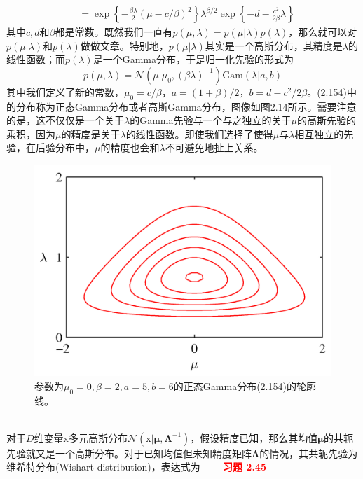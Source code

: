 \documentclass[b5paper]{book}
\numberwithin{equation}{chapter}
\newcommand {\bx} {\boldsymbol{\mathrm{x}}}
\newcommand {\bfMu} {\boldsymbol{\mu}}
\newcommand {\bfLambda} {\boldsymbol{\Lambda}}
\begin{document}
{\begin{equation}
\begin{split}
		&=\exp\left\{-\frac{\beta\lambda}{2}(\mu-c/\beta)^2\right\}\lambda^{\beta/2}\exp\left\{-{d-\frac{c^2}{2\beta}}\lambda\right\}
	\end{split}
	\end{equation}
	其中$c,d$和$\beta$都是常数。既然我们一直有$p(\mu,\lambda)=p(\mu|\lambda)p(\lambda)$，那么就可以对$p(\mu|\lambda)$和$p(\lambda)$做做文章。特别地，$p(\mu|\lambda)$其实是一个高斯分布，其精度是$\lambda$的线性函数；而$p(\lambda)$是一个Gamma分布，于是归一化先验的形式为
	\begin{equation}
		p(\mu,\lambda)=\mathcal{N}(\mu|\mu_0,(\beta\lambda)^{-1})\mathrm{Gam}(\lambda|a,b)
	\end{equation}
	其中我们定义了新的常数，$\mu_0=c/ \beta$，$a=(1+\beta)/2$，$b=d-c^2/2\beta$。(2.154)中的分布称为正态Gamma分布或者高斯Gamma分布，图像如图2.14所示。需要注意的是，这不仅仅是一个关于$\lambda$的Gamma先验与一个与之独立的关于$\mu$的高斯先验的乘积，因为$\mu$的精度是关于$\lambda$的线性函数。即使我们选择了使得$\mu$与$\lambda$相互独立的先验，在后验分布中，$\mu$的精度也会和$\lambda$不可避免地扯上关系。
	\begin{figure}[ht]
		\centering
		\includegraphics[scale=0.8]{Images/2-14.png}
		\caption{参数为$\mu_0=0,\beta=2,a=5,b=6$的正态Gamma分布(2.154)的轮廓线。}
		\label{fig:2-14}
	\end{figure}
	\\
	\indent 对于$D$维变量$\bx$多元高斯分布$\mathcal{N}(\bx|\bfMu,\bfLambda^{-1})$，假设精度已知，那么其均值$\bfMu$的共轭先验就又是一个高斯分布。对于已知均值但未知精度矩阵$\bfLambda$的情况，其共轭先验为维希特分布(Wishart distribution)，表达式为\textcolor{red}{\textbf{——习题 2.45}}
}
\end{document}
